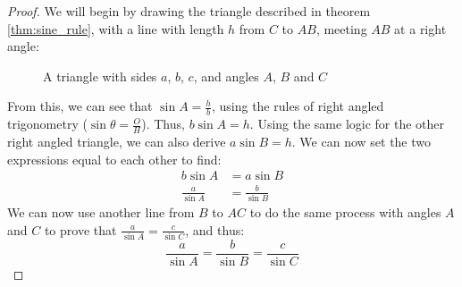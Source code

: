         \begin{proof}
                We will begin by drawing the triangle described in theorem \ref{thm:sine_rule}, with a line with length $h$ from $C$ to $AB$, meeting $AB$ at a right angle:
            \begin{figure}
                \begin{center}
                    \caption{A triangle with sides $a$, $b$, $c$, and angles $A$, $B$ and $C$}
                \end{center}
            \end{figure}
            From this, we can see that $\sin A=\frac{h}{b}$, using the rules of right angled \\ trigonometry ($\sin\theta=\frac{O}{H}$).
            Thus, $b\sin A=h$.
            Using the same logic for the other right angled triangle, we can also derive $a\sin B=h$.
            We can now set the two expressions equal to each other to find:
            \begin{equation*}
                \begin{aligned}
                    b\sin A&=a\sin B \\
                    \frac{a}{\sin A}&=\frac{b}{\sin B}
                \end{aligned}
            \end{equation*}
            We can now use another line from $B$ to $AC$ to do the same process with angles $A$ and $C$ to prove that $\frac{a}{\sin A}=\frac{c}{\sin C}$, and thus:
            \begin{equation}
                \frac{a}{\sin A}=\frac{b}{\sin B}=\frac{c}{\sin C}
            \end{equation}
        \end{proof}

